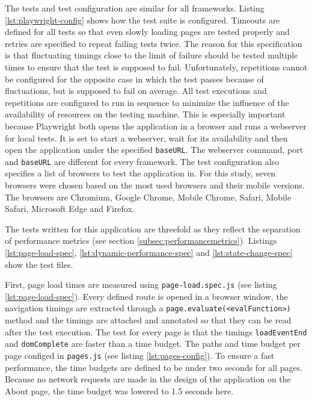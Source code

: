 \documentclass[a4paper, 12pt]{article}
\begin{document}
The tests and test configuration are similar for all frameworks.
Listing \ref{lst:playwright-config} shows how the test suite is configured.
Timeouts are defined for all tests so that even slowly loading pages are tested properly and retries are specified to repeat failing tests twice.
The reason for this specification is that fluctuating timings close to the limit of failure should be tested multiple times to ensure that the test is supposed to fail.
Unfortunately, repetitions cannot be configured for the opposite case in which the test passes because of fluctuations, but is supposed to fail on average.
All test executions and repetitions are configured to run in sequence to minimize the influence of the availability of resources on the testing machine.
This is especially important because Playwright both opens the application in a browser and runs a webserver for local tests.
It is set to start a webserver, wait for its availability and then open the application under the specified \verb|baseURL|.
The webserver command, port and \verb|baseURL| are different for every framework.
The test configuration also specifies a list of browsers to test the application in.
For this study, seven browsers were chosen based on the most used browsers \citep{browserUsage} and their mobile versions.
The browsers are Chromium, Google Chrome, Mobile Chrome, Safari, Mobile Safari, Microsoft Edge and Firefox.

The tests written for this application are threefold as they reflect the separation of performance metrics (see section \ref{subsec:performancemetrics}).
Listings \ref{lst:page-load-spec}, \ref{lst:dynamic-performance-spec} and \ref{lst:state-change-spec} show the test files.

First, page load times are measured using \verb|page-load.spec.js| (see listing \ref{lst:page-load-spec}).
Every defined route is opened in a browser window, the navigation timings are extracted through a \verb|page.evaluate(<evalFunction>)| method and the timings are attached and annotated so that they can be read after the test execution.
The test for every page is that the timings \verb|loadEventEnd| and \verb|domComplete| are faster than a time budget.
The paths and time budget per page configed in \verb|pages.js| (see listing \ref{lst:pages-config}).
To ensure a fast performance, the time budgets are defined to be under two seconds for all pages.
Because no network requests are made in the design of the application on the About page, the time budget was lowered to 1.5 seconds here.
\end{document}
